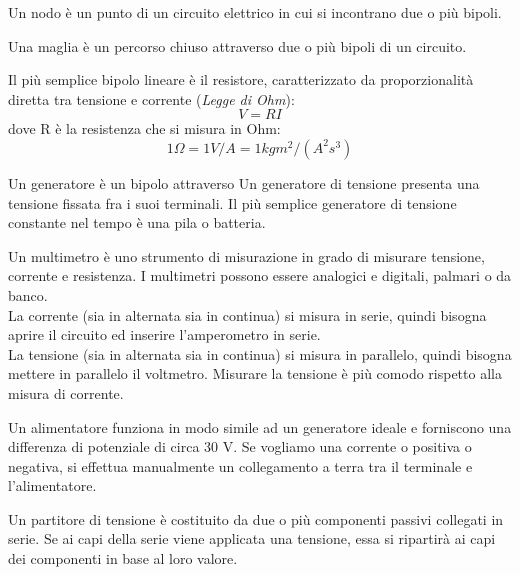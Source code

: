 \begin{defn}[Nodo]
	Un nodo è un punto di un circuito elettrico in cui si incontrano due o più bipoli.
\end{defn}

\begin{defn}[Maglia]
	Una maglia è un percorso chiuso attraverso due o più bipoli di un circuito.
\end{defn}

\begin{defn}
	Il più semplice bipolo lineare è il resistore, caratterizzato da proporzionalità diretta tra tensione e corrente (\emph{Legge di Ohm}): 
	$$ V = R I $$ dove R è la resistenza che si misura in Ohm: $$ 1 \Omega = 1 V/A = 1 kg m^2 / (A^2 s^3) $$
\end{defn}

\begin{defn}[Generatori]
	Un generatore è un bipolo attraverso 
	Un generatore di tensione presenta una tensione fissata fra i suoi terminali. Il più semplice generatore di tensione constante nel tempo è una pila o batteria. 
\end{defn}

\begin{defn}[Multimetro]
	Un multimetro è uno strumento di misurazione in grado di misurare tensione, corrente e resistenza. I multimetri possono essere analogici e digitali, palmari o da banco. \\
	La corrente (sia in alternata sia in continua) si misura in serie, quindi bisogna aprire il circuito ed inserire l'amperometro in serie. \\
	La tensione (sia in alternata sia in continua) si misura in parallelo, quindi bisogna mettere in parallelo il voltmetro. Misurare la tensione è più comodo rispetto alla misura di corrente. \\
\end{defn}

\begin{defn}[Alimentatore]
	Un alimentatore funziona in modo simile ad un generatore ideale e forniscono una differenza di potenziale di circa 30 V. Se vogliamo una corrente o positiva o negativa, si effettua manualmente un collegamento a terra tra il terminale e l'alimentatore. 
\end{defn}

\begin{defn}
	Un partitore di tensione è costituito da due o più componenti passivi collegati in serie. Se ai capi della serie viene applicata una tensione, essa si ripartirà ai capi dei componenti in base al loro valore. 
\end{defn}


